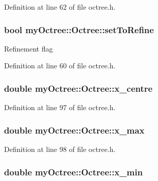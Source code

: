 Definition at line 62 of file octree.\+h.

\hypertarget{classmy_octree_1_1_octree_aad874752825bfcf0631d51abddcd6f8d}{}
\subsubsection[{set\+To\+Refine}]{\setlength{\rightskip}{0pt plus 5cm}bool my\+Octree\+::\+Octree\+::set\+To\+Refine}\label{classmy_octree_1_1_octree_aad874752825bfcf0631d51abddcd6f8d}
Refinement flag 

Definition at line 60 of file octree.\+h.

\hypertarget{classmy_octree_1_1_octree_afc540845d8c6d0db88f964d13126e52a}{}
\subsubsection[{x\+\_\+centre}]{\setlength{\rightskip}{0pt plus 5cm}double my\+Octree\+::\+Octree\+::x\+\_\+centre}\label{classmy_octree_1_1_octree_afc540845d8c6d0db88f964d13126e52a}


Definition at line 97 of file octree.\+h.

\hypertarget{classmy_octree_1_1_octree_a2a3291b5250cd29845ce2b8a6a4745d7}{}
\subsubsection[{x\+\_\+max}]{\setlength{\rightskip}{0pt plus 5cm}double my\+Octree\+::\+Octree\+::x\+\_\+max}\label{classmy_octree_1_1_octree_a2a3291b5250cd29845ce2b8a6a4745d7}


Definition at line 98 of file octree.\+h.

\hypertarget{classmy_octree_1_1_octree_af8b1fb4444afb1efc5cbcefc47443a58}{}
\subsubsection[{x\+\_\+min}]{\setlength{\rightskip}{0pt plus 5cm}double my\+Octree\+::\+Octree\+::x\+\_\+min}\label{classmy_octree_1_1_octree_af8b1fb4444afb1efc5cbcefc47443a58}


